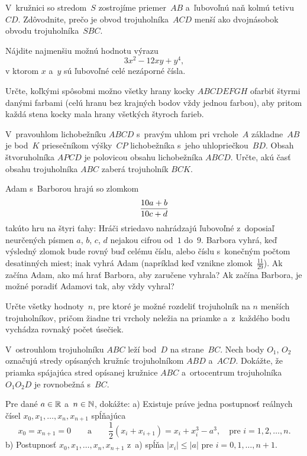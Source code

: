 {%
V~kružnici so stredom~$S$ zostrojíme priemer~$AB$ a~ľubovoľnú
naň kolmú tetivu~$CD$. Zdôvodnite, prečo je obvod trojuholníka~$ACD$
menší ako dvojnásobok obvodu trojuholníka~$SBC$.}

{%
Nájdite najmenšiu možnú hodnotu výrazu
$$
3x^2-12xy+y^4,
$$
v ktorom $x$ a~$y$ sú ľubovoľné celé nezáporné čísla.}

{%
Určte, koľkými spôsobmi možno všetky hrany kocky $ABCDEFGH$
ofarbiť štyrmi danými farbami (celú hranu bez krajných bodov
vždy jednou farbou), aby pritom každá stena kocky mala hrany všetkých
štyroch farieb.}

{%
V~pravouhlom lichobežníku $ABCD$ s~pravým uhlom pri vrchole~$A$ základne~$AB$ je
bod~$K$ priesečníkom výšky~$CP$ lichobežníka s~jeho uhlopriečkou~$BD$.
Obsah štvoruholníka $APCD$ je polovicou obsahu lichobežníka
$ABCD$. Určte, akú časť obsahu trojuholníka $ABC$ zaberá trojuholník $BCK$.}

{%
Adam s~Barborou hrajú so zlomkom
$$
{10a+b\over 10c+d}
$$
takúto hru na štyri ťahy: Hráči striedavo nahrádzajú ľubovoľné
z~doposiaľ neurčených písmen $a$, $b$, $c$, $d$
nejakou cifrou od~$1$ do~$9$. Barbora vyhrá, keď
výsledný zlomok bude rovný buď celému číslu, alebo číslu
s~konečným počtom
desatinných miest; inak vyhrá Adam (napríklad keď vznikne
zlomok~$\frac{11}{29}$). Ak začína Adam, ako
má hrať Barbora, aby zaručene vyhrala? Ak začína Barbora, je možné
poradiť Adamovi tak, aby vždy vyhral?}

{%
Určte všetky hodnoty~$n$, pre ktoré je možné rozdeliť trojuholník na $n$ menších trojuholníkov, pričom žiadne tri vrcholy neležia na priamke a~z~každého bodu vychádza rovnaký počet úsečiek.}

{%
V~ostrouhlom trojuholníku $ABC$ leží bod~$D$ na strane~$BC$. Nech body $O_1$, $O_2$ označujú stredy opísaných kružníc trojuholníkom $ABD$ a~$ACD$. Dokážte, že priamka spájajúca stred opísanej kružnice $ABC$ a~ortocentrum trojuholníka $O_1O_2D$ je rovnobežná s~$BC$.}

{%
Pre dané $a\in\Bbb{R}$ a~$n\in\Bbb{N}$, dokážte:
\ite a) Existuje práve jedna postupnosť reálnych čísel $x_0,x_1,\dots,x_n,x_{n+1}$ spĺňajúca
$$
x_0=x_{n+1}=0\qquad\text{a}\qquad\frac{1}{2}(x_i+x_{i+1})=x_i+x_i^3-a^3,\quad\text{pre $i=1,2,\dots,n$.}
$$
\ite b) Postupnosť $x_0,x_1,\dots,x_n,x_{n+1}$ z~a) spĺňa $|x_i|\le |a|$ pre $i=0,1,\dots,n+1$.}

